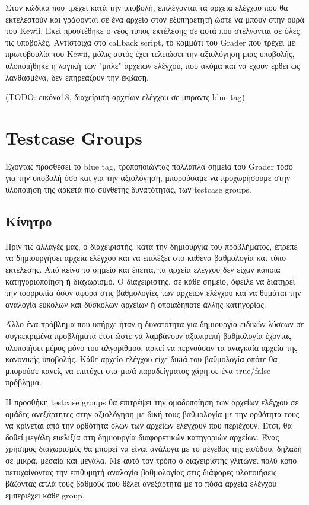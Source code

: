 \documentclass[diploma]{softlab-thesis}
\begin{document}
\bigskip

Στον κώδικα που τρέχει κατά την υποβολή, επιλέγονται τα αρχεία ελέγχου που θα
εκτελεστούν και γράφονται σε ένα αρχείο στον εξυπηρετητή ώστε να μπουν στην
ουρά του Kewii. Εκεί προστέθηκε ο νέος τύπος εκτέλεσης σε αυτά που στέλνονται
σε όλες τις υποβολές. Αντίστοιχα στο callback script, το κομμάτι του Grader που
τρέχει με πρωτοβουλία του Kewii, μόλις αυτός έχει τελειώσει την αξιολόγηση μιας
υποβολής, υλοποιήθηκε η λογική των "μπλε" αρχείων ελέγχου, που ακόμα και να
έχουν έρθει ως λανθασμένα, δεν επηρεάζουν την έκβαση.

(TODO: εικόνα18, διαχείριση αρχείων ελέγχου σε μπραντς blue tag)


\section{Testcase Groups}

Έχοντας προσθέσει το blue tag, τροποποιώντας πολλαπλά σημεία του Grader τόσο
για την υποβολή όσο και για την αξιολόγηση, μπορούσαμε να προχωρήσουμε στην
υλοποίηση της αρκετά πιο σύνθετης δυνατότητας, των testcase groups.

\subsection{Κίνητρο}

Πριν τις αλλαγές μας, ο διαχειριστής, κατά την δημιουργία του προβλήματος,
έπρεπε να δημιουργήσει αρχεία ελέγχου και να επιλέξει στο καθένα βαθμολογία και
τύπο εκτέλεσης. Από κείνο το σημείο και έπειτα, τα αρχεία ελέγχου δεν είχαν
κάποια κατηγοριοποίηση ή διαχωρισμό. Ο διαχειριστής, σε κάθε σημείο, όφειλε να
διατηρεί την ισορροπία όσον αφορά στις βαθμολογίες των αρχείων ελέγχου και να
θυμάται την αναλογία εύκολων και δύσκολων αρχείων ή οποιαδήποτε άλλης
κατηγορίας.

\bigskip

Άλλο ένα πρόβλημα που υπήρχε ήταν η δυνατότητα για δημιουργία ειδικών λύσεων σε
συγκεκριμένα προβλήματα έτσι ώστε να λαμβάνουν αξιοπρεπή βαθμολογία έχοντας
υλοποιήσει μέρος μόνο του αλγορίθμου, αρκεί να περνούσαν τα αναγκαία αρχεία της
κανονικής υποβολής. Κάθε αρχείο ελέγχου είχε δικιά του βαθμολογία οπότε θα
μπορούσε κανείς να επιτύχει στα μισά παραδείγματος χάρη σε ένα true/false
πρόβλημα.

\bigskip

Η προσθήκη testcase groups θα επιτρέψει την ομαδοποίηση των αρχείων ελέγχου σε
ομάδες ανεξάρτητες στην αξιολόγηση με δική τους βαθμολογία με την ορθότητα τους
να κρίνεται από την ορθότητα όλων των αρχείων ελέγχουν που περιέχουν. Έτσι, θα
δοθεί μεγάλη ευελιξία στη δημιουργία διαφορετικών κατηγοριών αρχείων. Ένας
χρήσιμος διαχωρισμός θα μπορεί να είναι ανάλογα με το μέγεθος της εισόδου,
δηλαδή σε μικρά, μεσαία και μεγάλα. Με αυτό τον τρόπο ο διαχειριστής γλιτώνει
πολύ κόπο πετυχαίνοντας την επιθυμητή αναλογία βαθμολογίας στις διάφορες
υλοποιήσεις βάζοντας απλά τους βαθμούς που θέλει ανεξάρτητα με το πόσα αρχεία
ελέγχου εμπεριέχει κάθε group.
\end{document}
